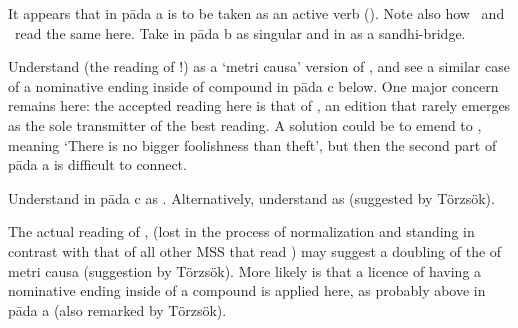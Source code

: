 { It appears that  in pāda a is to be taken as an active verb ().                  Note also how \msCb\ and \msNc\ read the same here.  Take  in pāda b as singular and  in  as a sandhi-bridge. }





{ Understand  (the reading of \Ed!) as a `metri causa' version of                 , and see a similar case of a nominative ending                 inside of compound in pāda c below. One major concern remains here:                 the accepted reading here is that of \Ed, an edition that rarely emerges as                  the sole transmitter of the best reading. A solution could be                  to emend to , meaning `There is no bigger foolishness than theft',                 but then the second part of pāda a is difficult to connect.                  

   Understand  in pāda c as .                 Alternatively, understand  as  (suggested by Törzsök).                 

                 The actual reading of \msCa,  (lost in the process of normalization and standing                         in contrast with that of all other MSS that read ) may suggest                         a doubling of the  of  metri causa (suggestion by Törzsök).                         More likely is that a licence of having a nominative ending inside of a compound                         is applied here, as probably above in pāda a (also remarked by Törzsök). }





